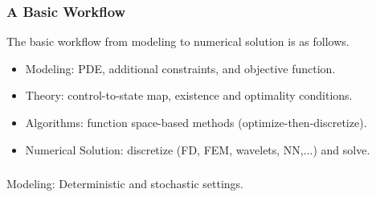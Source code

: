 \documentclass[aspectratio=169,xcolor=dvipsnames,10pt]{beamer}
\begin{document}
\begin{frame}\frametitle{A Basic Workflow}
\begin{exampleblock}{}
The basic workflow from modeling to numerical solution is as follows.
\begin{itemize}
\item Modeling: PDE, additional constraints, and objective function.

\item Theory: control-to-state map, existence and optimality conditions.

\item Algorithms: function space-based methods (optimize-then-discretize).

\item Numerical Solution: discretize (FD, FEM, wavelets, NN,...) and solve.
\end{itemize}
\end{exampleblock}
\end{frame}

\begin{frame}\frametitle{}
\begin{center}\Large
Modeling: Deterministic and stochastic settings.
\end{center}
\end{frame}


\end{document}
